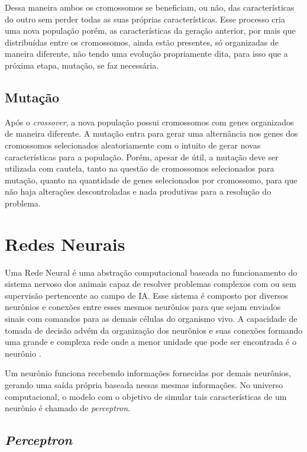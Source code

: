 Dessa maneira ambos os cromossomos se beneficiam, ou não, das
características do outro sem perder todas as suas próprias
características. Esse processo cria uma nova população porém,
as características da geração anterior, por mais que
distribuídas entre os cromossomos, ainda estão presentes, só
organizadas de maneira diferente, não tendo uma evolução
propriamente dita, para isso que a próxima etapa, mutação, se
faz necessária.

\subsection{Muta{\c c}{\~a}o}

Após o \textit{crossover}, a nova população possui cromossomos
com genes organizados de maneira diferente. A mutação entra
para gerar uma alternância nos genes dos cromossomos
selecionados aleatoriamente com o intuito de gerar novas
características para a população. Porém, apesar de útil, a
mutação deve ser utilizada com cautela, tanto na questão de
cromossomos selecionados para mutação, quanto na quantidade de
genes selecionados por cromossomo, para que não haja
alterações descontroladas e nada produtivas para a resolução
do problema.

\section{Redes Neurais}

Uma Rede Neural é uma abstração computacional baseada no 
funcionamento do sistema nervoso dos animais capaz de resolver problemas 
complexos com ou sem supervisão pertencente ao campo de IA. Esse sistema é 
composto por diversos neurônios e conexões entre esses mesmos neurônios para 
que sejam enviados sinais com comandos para as demais células do organismo 
vivo. A capacidade de tomada de decisão advém da organização dos neurônios e 
suas conexões formando uma grande e complexa rede onde a menor unidade que 
pode ser encontrada é o neurônio \cite{rojas2013neural}.

Um neurônio funciona recebendo informações fornecidas por demais neurônios,
gerando uma saída própria baseada nessas mesmas informações. No universo
computacional, o modelo com o objetivo de simular tais características de um
neurônio é chamado de \textit{perceptron}.

\subsection{\textit{Perceptron}}

